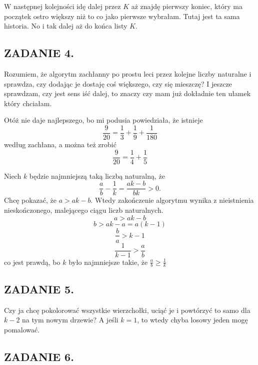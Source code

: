 \documentclass{article}
\begin{document}
W następnej kolejności idę dalej przez $K$ aż znajdę pierwszy koniec, który ma początek ostro większy niż to co jako pierwsze wybrałam. Tutaj jest ta sama historia. No i tak dalej aż do końca listy $K$.


\subsection*{ZADANIE 4.}

Rozumiem, że algorytm zachłanny po prostu leci przez kolejne liczby naturalne i sprawdza, czy dodając je dostaję coś większego, czy się mieszczę? I jeszcze sprawdzam, czy jest sens iść dalej, to znaczy czy mam już dokładnie ten ułamek który chciałam.


Otóż nie daje najlepszego, bo mi podusia powiedziała, że istnieje
$$\frac{9}{20}=\frac13+\frac19+\frac1{180}$$
według zachłana, a można też zrobić
$$\frac9{20}=\frac14+\frac15$$

Niech $k$ będzie najmniejszą taką liczbą naturalną, że
$$\frac{a}{b}-\frac1k=\frac{ak-b}{bk}>0.$$
Chcę pokazać, że $a>ak-b$. Wtedy zakończenie algorytmu wynika z nieistnienia nieskończonego, malejącego ciągu liczb naturalnych.
$$a>ak-b$$
$$b>ak-a=a(k-1)$$
$$\frac{b}{a}>k-1$$
$$\frac{1}{k-1}>\frac{a}{b}$$
co jest prawdą, bo $k$ było najmniejsze takie, że $\frac{a}{b}\geq\frac{1}{k}$



\subsection*{ZADANIE 5.}

Czy ja chcę pokolorować wszystkie wierzchołki, uciąć je i powtórzyć to samo dla $k-2$ na tym nowym drzewie? A jeśli $k=1$, to wtedy chyba losowy jeden mogę pomalować.

\subsection*{ZADANIE 6.}
\end{document}
